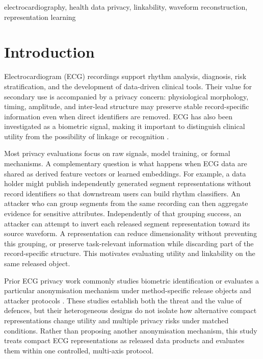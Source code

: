 \documentclass[journal]{IEEEtran}
\begin{document}
\begin{IEEEkeywords}
electrocardiography, health data privacy, linkability, waveform reconstruction,
representation learning
\end{IEEEkeywords}

\section{Introduction}
\label{sec:introduction}

Electrocardiogram (ECG) recordings support rhythm analysis, diagnosis, risk
stratification, and the development of data-driven clinical tools. Their value
for secondary use is accompanied by a privacy concern: physiological
morphology, timing, amplitude, and inter-lead structure may preserve stable
record-specific information even when direct identifiers are removed. ECG has
also been investigated as a biometric signal, making it important to
distinguish clinical utility from the possibility of linkage or recognition
\cite{Odinaka2012ECGBiometric,Pereira2023ECGBiometricReview}.

Most privacy evaluations focus on raw signals, model training, or formal
mechanisms. A complementary question is what happens when ECG data are shared
as derived feature vectors or learned embeddings. For example, a data holder
might publish independently generated segment representations without record
identifiers so that downstream users can build rhythm classifiers. An
attacker who can group segments from the same recording can then aggregate
evidence for sensitive attributes. Independently of that grouping success, an
attacker can attempt to invert each released segment representation toward its
source waveform. A representation can reduce dimensionality without preventing this grouping,
or preserve task-relevant information while discarding part of the
record-specific structure. This motivates evaluating utility and linkability
on the same released object.

Prior ECG privacy work commonly studies biometric identification or evaluates
a particular anonymisation mechanism under method-specific release objects and
attacker protocols
\cite{Macierzanka2025SiameseECG,Wang2025ECGLinkage,NolinLapalme2023PrivECG,Lee2026PrivacyECG,Shishir2026PPVAE}.
These studies establish both the threat and the value of defences, but their
heterogeneous designs do not isolate how alternative compact representations
change utility and multiple privacy risks under matched conditions. Rather
than proposing another anonymisation mechanism, this study treats compact ECG
representations as released data products and evaluates them within one
controlled, multi-axis protocol.
\end{document}
